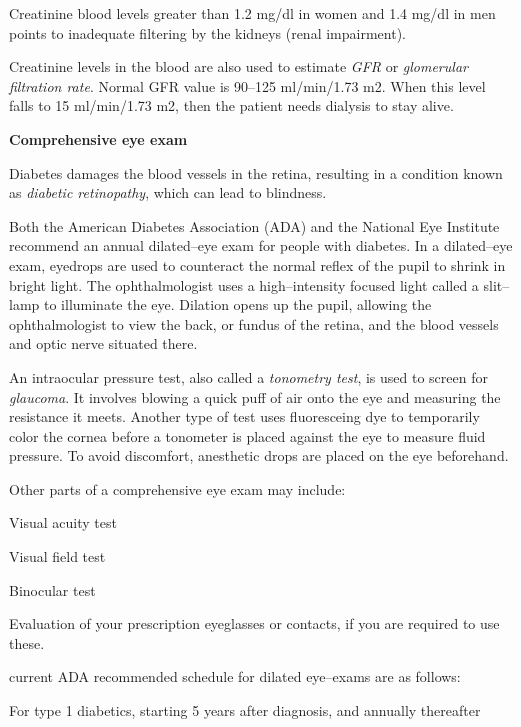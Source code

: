 Creatinine blood levels greater than 1.2 mg/dl in women and 1.4 mg/dl in men points to inadequate filtering by the kidneys (renal impairment).

Creatinine levels in the blood are also used to estimate \textit{GFR} or \textit{glomerular filtration rate}. Normal GFR value is 90–125 ml/min/1.73 m2. When this level falls to 15 ml/min/1.73 m2, then the patient needs dialysis to stay alive.

\textbf{Comprehensive eye exam}

Diabetes damages the blood vessels in the retina, resulting in a condition known as \textit{diabetic retinopathy}, which can lead to blindness.

Both the American Diabetes Association (ADA) and the National Eye Institute recommend an annual dilated–eye exam for people with diabetes. In a dilated–eye exam, eyedrops are used to counteract the normal reflex of the pupil to shrink in bright light. The ophthalmologist uses a high–intensity focused light called a slit–lamp to illuminate the eye. Dilation opens up the pupil, allowing the ophthalmologist to view the back, or fundus of the retina, and the blood vessels and optic nerve situated there.

An intraocular pressure test, also called a \textit{tonometry test}, is used to screen for \textit{glaucoma}. It involves blowing a quick puff of air onto the eye and measuring the resistance it meets. Another type of test uses fluoresceing dye to temporarily color the cornea before a tonometer is placed against the eye to measure fluid pressure. To avoid discomfort, anesthetic drops are placed on the eye beforehand.

Other parts of a comprehensive eye exam may include:

\item Visual acuity test

 \item Visual field test

 \item Binocular test

 \item Evaluation of your prescription eyeglasses or contacts, if you are required to use these.

 \item current ADA recommended schedule for dilated eye–exams are as follows:

 \item For type 1 diabetics, starting 5 years after diagnosis, and annually thereafter


